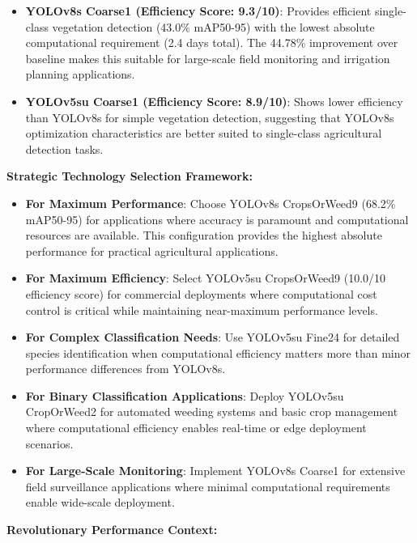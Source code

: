 \begin{itemize}
    \item \textbf{YOLOv8s Coarse1 (Efficiency Score: 9.3/10)}: Provides efficient single-class vegetation detection (43.0\% mAP50-95) with the lowest absolute computational requirement (2.4 days total). The 44.78\% improvement over baseline makes this suitable for large-scale field monitoring and irrigation planning applications.
    
    \item \textbf{YOLOv5su Coarse1 (Efficiency Score: 8.9/10)}: Shows lower efficiency than YOLOv8s for simple vegetation detection, suggesting that YOLOv8s optimization characteristics are better suited to single-class agricultural detection tasks.
\end{itemize}

\textbf{Strategic Technology Selection Framework:}

\begin{itemize}
    \item \textbf{For Maximum Performance}: Choose YOLOv8s CropsOrWeed9 (68.2\% mAP50-95) for applications where accuracy is paramount and computational resources are available. This configuration provides the highest absolute performance for practical agricultural applications.
    
    \item \textbf{For Maximum Efficiency}: Select YOLOv5su CropsOrWeed9 (10.0/10 efficiency score) for commercial deployments where computational cost control is critical while maintaining near-maximum performance levels.
    
    \item \textbf{For Complex Classification Needs}: Use YOLOv5su Fine24 for detailed species identification when computational efficiency matters more than minor performance differences from YOLOv8s.
    
    \item \textbf{For Binary Classification Applications}: Deploy YOLOv5su CropOrWeed2 for automated weeding systems and basic crop management where computational efficiency enables real-time or edge deployment scenarios.
    
    \item \textbf{For Large-Scale Monitoring}: Implement YOLOv8s Coarse1 for extensive field surveillance applications where minimal computational requirements enable wide-scale deployment.
\end{itemize}

\textbf{Revolutionary Performance Context:}

